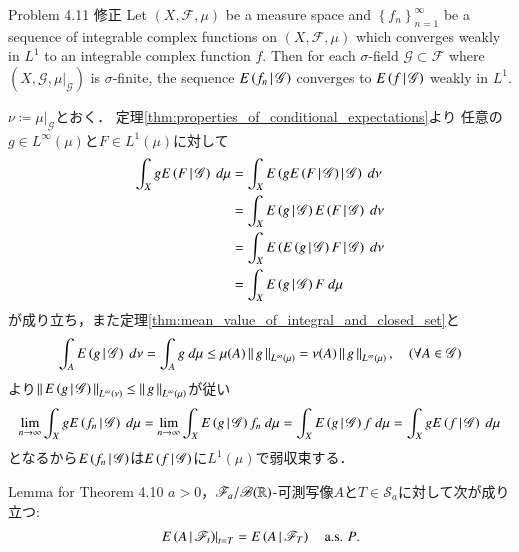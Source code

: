 	\begin{itembox}[l]{Problem 4.11 修正}
		Let $(X,\mathscr{F},\mu)$ be a measure space and  
		$\left\{f_n\right\}_{n=1}^\infty$ be a sequence of integrable complex functions on $(X,\mathscr{F},\mu)$
		which converges weakly in $L^1$ to an integrable complex function $f$.
		Then for each $\sigma$-field $\mathscr{G} \subset \mathscr{F}$
		where $(X,\mathscr{G},\left.\mu\right|_{\mathscr{G}})$ is $\sigma$-finite,
		the sequence $E\left( f_n \, \middle|\, \mathscr{G} \right)$ converges to $E\left( f \, \middle|\, \mathscr{G} \right)$ weakly in $L^1$.
	\end{itembox}
	
	\begin{prf}
		$\nu \coloneqq \left.\mu\right|_{\mathscr{G}}$とおく．
		定理\ref{thm:properties_of_conditional_expectations}より
		任意の$g \in L^\infty(\mu)$と$F \in L^1(\mu)$に対して
		\begin{align}
			\int_X g\cexp{F}{\mathscr{G}}\ d\mu
			&= \int_X \cexp{g\cexp{F}{\mathscr{G}}}{\mathscr{G}}\ d\nu \\
			&= \int_X \cexp{g}{\mathscr{G}}\cexp{F}{\mathscr{G}}\ d\nu \\
			&= \int_X \cexp{\cexp{g}{\mathscr{G}}F}{\mathscr{G}}\ d\nu \\
			&= \int_X \cexp{g}{\mathscr{G}}F\ d\mu
		\end{align}
		が成り立ち，また定理\ref{thm:mean_value_of_integral_and_closed_set}と
		\begin{align}
			\int_A E\left( g \, \middle|\, \mathscr{G} \right)\ d\nu = \int_A g\ d\mu \leq \mu(A) \left\|\, g\, \right\|_{L^\infty(\mu)}
			= \nu(A) \left\|\, g\, \right\|_{L^\infty(\mu)},
			\quad (\forall A \in \mathscr{G})
		\end{align}
		より$\left\|\, E\left( g \, \middle|\, \mathscr{G} \right)\, \right\|_{L^\infty(\nu)} \leq \left\|\, g\, \right\|_{L^\infty(\mu)}$が従い
		\begin{align}
			\lim_{n \to \infty} \int_X gE\left( f_n \, \middle|\, \mathscr{G} \right)\ d\mu
			= \lim_{n \to \infty} \int_X E\left( g \, \middle|\, \mathscr{G} \right)f_n\ d\mu
			= \int_X E\left( g \, \middle|\, \mathscr{G} \right)f\ d\mu
			= \int_X gE\left( f \, \middle|\, \mathscr{G} \right)\ d\mu
		\end{align}
		となるから$E\left( f_n \, \middle|\, \mathscr{G} \right)$は$E\left( f \, \middle|\, \mathscr{G} \right)$に$L^1(\mu)$で弱収束する．
		\QED
	\end{prf}
	
	\begin{itembox}[l]{Lemma for Theorem 4.10}
		$a > 0$，$\mathscr{F}_a/\mathscr{B}(\mathbb{R})$-可測写像$A$と$T \in \mathscr{S}_a$に対して次が成り立つ:
		\begin{align}
			\left. E\left( A \, \middle|\, \mathscr{F}_t \right) \right|_{t = T} = E\left( A \, \middle|\, \mathscr{F}_T \right)
			\quad \mbox{a.s. $P$}.
			\label{eq:lemma_for_theorem_4_10}
		\end{align}
	\end{itembox}
	
